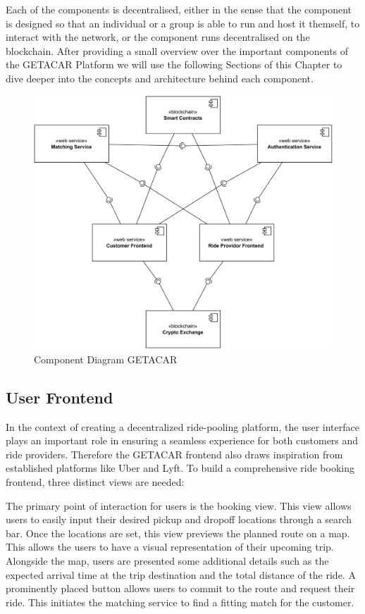 Each of the components is decentralised, either in the sense that the component is designed so that an individual or a group is able to run and host it themself, to interact with the network, or the component runs decentralised on the blockchain. After providing a small overview over the important components of the GETACAR Platform we will use the following Sections of this Chapter to dive deeper into the concepts and architecture behind each component. 

\begin{figure}[h]
    \centering
    \includegraphics[width=\linewidth]{data/10.svg}
    \caption{Component Diagram GETACAR}
    \label{fig:directSVG}
\end{figure}

\subsection{User Frontend}\label{subsec:UserFrontend}
In the context of creating a decentralized ride-pooling platform, the user interface plays an important role in ensuring a seamless experience for both customers and ride providers. Therefore the GETACAR frontend also draws inspiration from established platforms like Uber and Lyft. To build a comprehensive ride booking frontend, three distinct views are needed:

The primary point of interaction for users is the booking view. This view allows users to easily input their desired pickup and dropoff locations through a search bar. Once the locations are set, this view previews the planned route on a map. This allows the users to have a visual representation of their upcoming trip. Alongside the map, users are presented some additional details such as the expected arrival time at the trip destination and the total distance of the ride. A prominently placed button allows users to commit to the route and request their ride. This initiates the matching service to find a fitting match for the customer.

